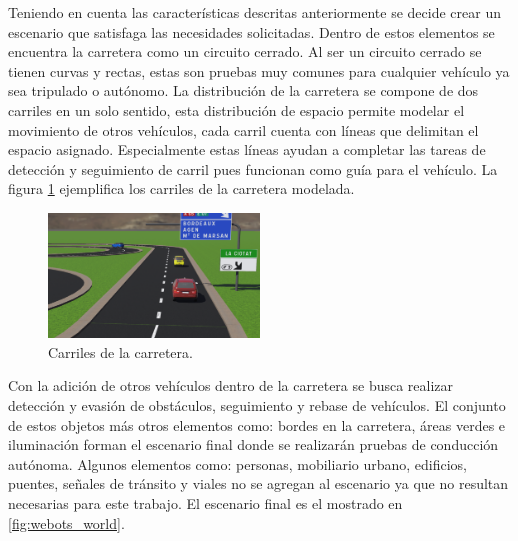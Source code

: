 Teniendo en cuenta las características descritas anteriormente se decide crear un escenario que satisfaga las necesidades solicitadas. Dentro de estos elementos se encuentra la carretera como un circuito cerrado. Al ser un circuito cerrado se tienen curvas y rectas, estas son pruebas muy comunes para cualquier vehículo ya sea tripulado o autónomo. La distribución de la carretera se compone de dos carriles en un solo sentido, esta distribución de espacio permite modelar el movimiento de otros vehículos, cada carril cuenta con líneas que delimitan el espacio asignado. Especialmente  estas líneas ayudan a completar las tareas de detección y seguimiento de carril pues funcionan como guía para el vehículo. La figura \ref{fig:world_lanes} ejemplifica los carriles de la carretera modelada.
\begin{figure}
    \centering
    \includegraphics[width=0.5\textwidth]{Figures/Figures_Cap03/world_lanes.png}
    \caption{Carriles de la carretera.}
    \label{fig:world_lanes}
\end{figure}
Con la adición de otros vehículos dentro de la carretera se busca realizar detección y evasión de obstáculos, seguimiento y rebase de vehículos. El conjunto de estos objetos más otros elementos como: bordes en la carretera, áreas verdes e iluminación forman el escenario final donde se realizarán pruebas de conducción autónoma. Algunos elementos como: personas, mobiliario urbano, edificios, puentes, señales de tránsito y viales no se agregan al escenario ya que no resultan necesarias para este trabajo. El escenario final es el mostrado en \ref{fig:webots_world}.
